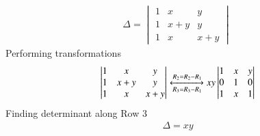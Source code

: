 \begin{align}
\Delta=\begin{vmatrix}
1&x&y\\1&x+y&y\\1&x&x+y
\end{vmatrix}\
\end{align}
\newline
Performing transformations
\newline
\begin{align}
\begin{vmatrix}
1&x&y\\1&x+y&y\\1&x&x+y
\end{vmatrix}\xleftrightarrow[R_3=R_3-R_1]{R_2 = R_2 - R_1} xy\begin{vmatrix}
1&x&y\\0&1&0\\1&x&1
\end{vmatrix}    
\end{align}
Finding determinant along Row 3
\begin{align}
\Delta=xy    
\end{align}








